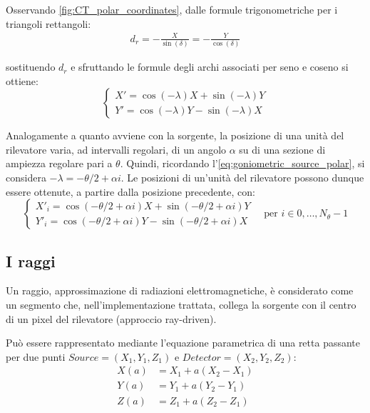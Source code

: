 \documentclass[12pt,a4paper]{report}
\begin{document}
Osservando \autoref{fig:CT_polar_coordinates}, dalle formule trigonometriche per i triangoli rettangoli:
\begin{align*}
  d_r = -\frac{X}{\sin(\delta)} = -\frac{Y}{\cos(\delta)}
\end{align*}

sostituendo \(d_r\) e sfruttando le formule degli archi associati per seno e coseno si ottiene:
\begin{equation*}
  \begin{cases}
    X' = \cos(-\lambda) X + \sin(-\lambda) Y \\
    Y' = \cos(-\lambda) Y - \sin(-\lambda) X
  \end{cases}
\end{equation*}

Analogamente a quanto avviene con la sorgente, la posizione di una unità del rilevatore varia, ad intervalli regolari, di
un angolo \(\alpha\) su di una sezione di ampiezza regolare pari a \(\theta\).
Quindi, ricordando l'\autoref{eq:goniometric_source_polar}, si considera \(-\lambda = -\theta/2 + \alpha i\).
Le posizioni di un'unità del rilevatore possono dunque essere ottenute, a partire dalla posizione precedente, con:
\begin{equation*}
  \begin{cases}
    X'_i = \cos(-\theta/2 + \alpha i) X + \sin(-\theta/2 + \alpha i) Y \\
    Y'_i = \cos(-\theta/2 + \alpha i) Y - \sin(-\theta/2 + \alpha i) X
  \end{cases} \quad \text{per } i \in 0,\dots,N_\theta - 1
\end{equation*}

\subsection{I raggi}

Un raggio, approssimazione di radiazioni elettromagnetiche, è considerato come un segmento che, nell'implementazione trattata,
collega la sorgente con il centro di un pixel del rilevatore (approccio ray-driven).

Può essere rappresentato mediante l'equazione parametrica di una retta passante per due punti \(Source = (X_1, Y_1, Z_1)\) e
\(Detector = (X_2, Y_2, Z_2)\):
\begin{align*}
  X(a) &= X_1 + a (X_2 - X_1) \\
  Y(a) &= Y_1 + a (Y_2 - Y_1) \\
  Z(a) &= Z_1 + a (Z_2 - Z_1)
\end{align*}
\end{document}
